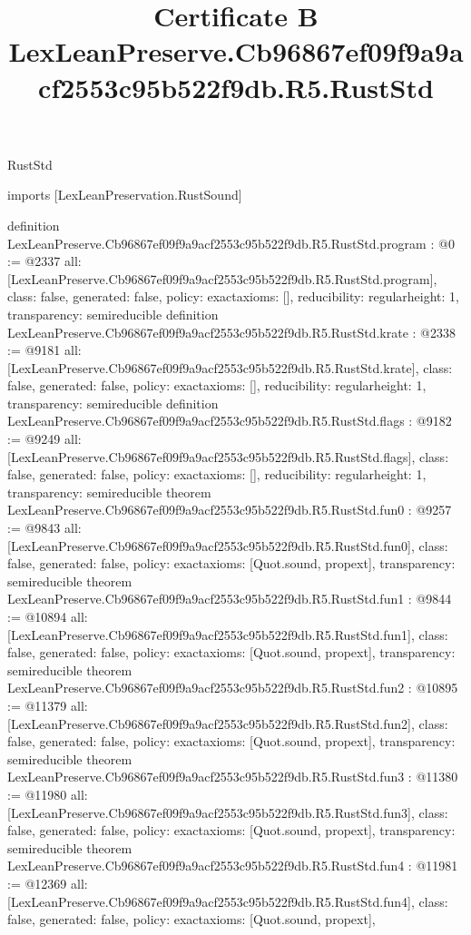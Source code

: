 \begin{lexlean}{RustStd}
\title{Certificate B LexLeanPreserve.Cb96867ef09f9a9acf2553c95b522f9db.R5.RustStd}
\begin{coremodule}
imports [LexLeanPreservation.RustSound]

definition LexLeanPreserve.Cb96867ef09f9a9acf2553c95b522f9db.R5.RustStd.program : @0 := @2337 {
  all: [LexLeanPreserve.Cb96867ef09f9a9acf2553c95b522f9db.R5.RustStd.program],
  class: false,
  generated: false,
  policy: exact{axioms: []},
  reducibility: regular{height: 1},
  transparency: semireducible
}
definition LexLeanPreserve.Cb96867ef09f9a9acf2553c95b522f9db.R5.RustStd.krate : @2338 := @9181 {
  all: [LexLeanPreserve.Cb96867ef09f9a9acf2553c95b522f9db.R5.RustStd.krate],
  class: false,
  generated: false,
  policy: exact{axioms: []},
  reducibility: regular{height: 1},
  transparency: semireducible
}
definition LexLeanPreserve.Cb96867ef09f9a9acf2553c95b522f9db.R5.RustStd.flags : @9182 := @9249 {
  all: [LexLeanPreserve.Cb96867ef09f9a9acf2553c95b522f9db.R5.RustStd.flags],
  class: false,
  generated: false,
  policy: exact{axioms: []},
  reducibility: regular{height: 1},
  transparency: semireducible
}
theorem LexLeanPreserve.Cb96867ef09f9a9acf2553c95b522f9db.R5.RustStd.fun0 : @9257 := @9843 {
  all: [LexLeanPreserve.Cb96867ef09f9a9acf2553c95b522f9db.R5.RustStd.fun0],
  class: false,
  generated: false,
  policy: exact{axioms: [Quot.sound, propext]},
  transparency: semireducible
}
theorem LexLeanPreserve.Cb96867ef09f9a9acf2553c95b522f9db.R5.RustStd.fun1 : @9844 := @10894 {
  all: [LexLeanPreserve.Cb96867ef09f9a9acf2553c95b522f9db.R5.RustStd.fun1],
  class: false,
  generated: false,
  policy: exact{axioms: [Quot.sound, propext]},
  transparency: semireducible
}
theorem LexLeanPreserve.Cb96867ef09f9a9acf2553c95b522f9db.R5.RustStd.fun2 : @10895 := @11379 {
  all: [LexLeanPreserve.Cb96867ef09f9a9acf2553c95b522f9db.R5.RustStd.fun2],
  class: false,
  generated: false,
  policy: exact{axioms: [Quot.sound, propext]},
  transparency: semireducible
}
theorem LexLeanPreserve.Cb96867ef09f9a9acf2553c95b522f9db.R5.RustStd.fun3 : @11380 := @11980 {
  all: [LexLeanPreserve.Cb96867ef09f9a9acf2553c95b522f9db.R5.RustStd.fun3],
  class: false,
  generated: false,
  policy: exact{axioms: [Quot.sound, propext]},
  transparency: semireducible
}
theorem LexLeanPreserve.Cb96867ef09f9a9acf2553c95b522f9db.R5.RustStd.fun4 : @11981 := @12369 {
  all: [LexLeanPreserve.Cb96867ef09f9a9acf2553c95b522f9db.R5.RustStd.fun4],
  class: false,
  generated: false,
  policy: exact{axioms: [Quot.sound, propext]},
}
\end{coremodule}
\end{lexlean}
